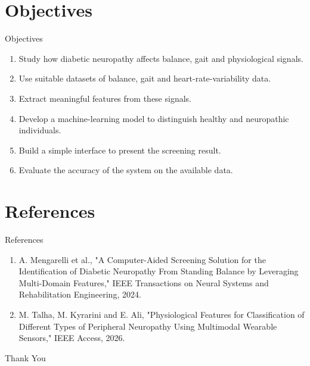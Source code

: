 \documentclass[10pt,aspectratio=1610]{beamer}
\begin{document}

\section{Objectives}

\begin{frame}{Objectives}

\begin{enumerate}

\item Study how diabetic neuropathy affects balance, gait and physiological signals.

\item Use suitable datasets of balance, gait and heart-rate-variability data.

\item Extract meaningful features from these signals.

\item Develop a machine-learning model to distinguish healthy and neuropathic individuals.

\item Build a simple interface to present the screening result.

\item Evaluate the accuracy of the system on the available data.

\end{enumerate}

\end{frame}


\section{References}

{
\begin{frame}[allowframebreaks]{References}

\small

\begin{enumerate}

\item A. Mengarelli et al., "A Computer-Aided Screening Solution for the Identification of Diabetic Neuropathy From Standing Balance by Leveraging Multi-Domain Features," IEEE Transactions on Neural Systems and Rehabilitation Engineering, 2024.

\item M. Talha, M. Kyrarini and E. Ali, "Physiological Features for Classification of Different Types of Peripheral Neuropathy Using Multimodal Wearable Sensors," IEEE Access, 2026.

\end{enumerate}

\end{frame}}


\begin{frame}

\centering

\Huge\textcolor{myNewColorA}{Thank You}

\end{frame}
\end{document}
